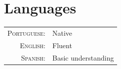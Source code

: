 \documentclass[letter,10pt]{article} %
\begin{document}

\section{Languages}

\begin{tabular}{rl}
	\textsc{Portuguese:} & Native\\
	
	\textsc{English:} & Fluent\\
	
	\textsc{Spanish:} & Basic understanding\\
	
\end{tabular} \\


\end{document}
